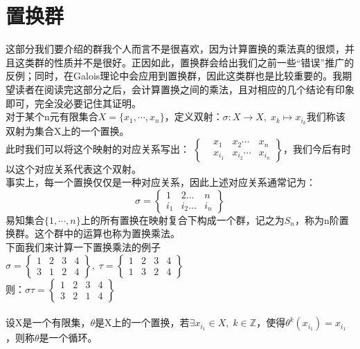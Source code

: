 \section{置换群}
这部分我们要介绍的群我个人而言不是很喜欢，因为计算置换的乘法真的很烦，并且这类群的性质并不是很好。正因如此，置换群会给出我们之前一些“错误”推广的反例；同时，在Galois理论中会应用到置换群，因此这类群也是比较重要的。我期望读者在阅读完这部分之后，会计算置换之间的乘法，且对相应的几个结论有印象即可，完全没必要记住其证明。\\
对于某个n元有限集合$X=\{x_1,\cdots,x_n\}$，定义双射：$\sigma \colon X\to X,\; x_k\mapsto x_{i_k}$我们称该双射为集合X上的一个置换。\\
此时我们可以将这个映射的对应关系写出：
$\left\{
\begin{array}{cccc}
&x_1&x_2\cdots &x_n\\
&x_{i_1}&x_{i_2}\cdots &x_{i_n}
\end{array}
\right\}$，我们今后有时以这个对应关系代表这个双射。\\
事实上，每一个置换仅仅是一种对应关系，因此上述对应关系通常记为：
\[
\sigma=
\left\{
\begin{array}{cccc}
1&2\ldots &n\\
i_1&i_2\ldots &i_n
\end{array}
\right\}
\]
易知集合$\{1,\cdots,n\}$上的所有置换在映射复合下构成一个群，记之为$S_n$，称为n阶置换群。这个群中的运算也称为置换乘法。\\
下面我们来计算一下置换乘法的例子\\
$\sigma =
\left \{
\begin{array}{cccc}
1&2&3&4\\
3&1&2&4
\end{array}
\right\}
,\; \tau=
\left\{
\begin{array}{cccc}
1&2&3&4\\
1&3&2&4
\end{array}
\right\}$\\
则：$\sigma\tau=
\left\{
\begin{array}{cccc}
1&2&3&4\\
3&2&1&4
\end{array}
\right\}$\\
\\
设X是一个有限集，$\theta$是X上的一个置换，若$\exists x_{i_1}\in X,\; k\in \mathbb{Z}$，使得$\theta^k(x_{i_1})=x_{i_1}$，则称$\theta$是一个循环。\\
